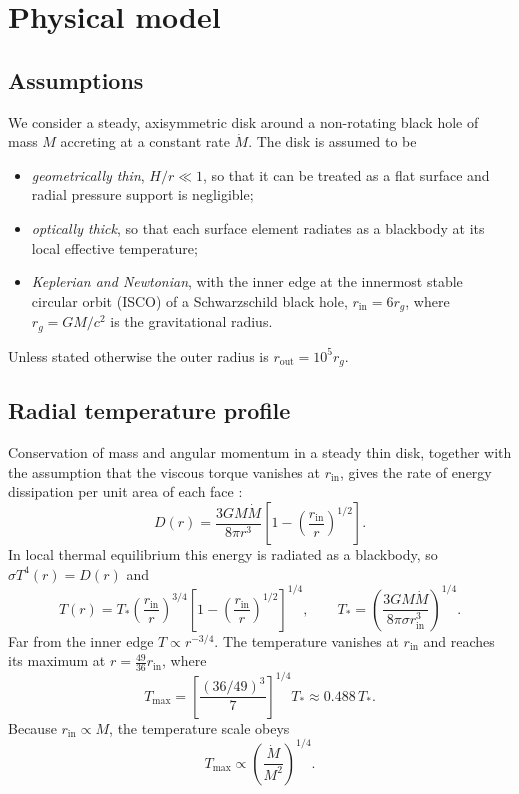 \documentclass[11pt,a4paper]{article}
\newcommand{\Mdot}{\dot M}
\newcommand{\rin}{r_{\mathrm{in}}}
\newcommand{\rout}{r_{\mathrm{out}}}
\newcommand{\Tmax}{T_{\max}}
\newcommand{\rg}{r_{g}}
\begin{document}
\section{Physical model}\label{sec:theory}

\subsection{Assumptions}
We consider a steady, axisymmetric disk around a non-rotating black hole of
mass $M$ accreting at a constant rate $\Mdot$. The disk is assumed to be
\begin{itemize}
  \item \emph{geometrically thin}, $H/r\ll1$, so that it can be treated as a
        flat surface and radial pressure support is negligible;
  \item \emph{optically thick}, so that each surface element radiates as a
        blackbody at its local effective temperature;
  \item \emph{Keplerian and Newtonian}, with the inner edge at the innermost
        stable circular orbit (ISCO) of a Schwarzschild black hole,
        $\rin=6\rg$, where $\rg=GM/c^2$ is the gravitational radius.
\end{itemize}
Unless stated otherwise the outer radius is $\rout=10^5\rg$.

\subsection{Radial temperature profile}
Conservation of mass and angular momentum in a steady thin disk, together
with the assumption that the viscous torque vanishes at $\rin$, gives the
rate of energy dissipation per unit area of each face
\citep{ShakuraSunyaev1973,FrankKingRaine2002}:
\begin{equation}
  D(r)=\frac{3GM\Mdot}{8\pi r^3}\left[1-\left(\frac{\rin}{r}\right)^{1/2}\right].
\end{equation}
In local thermal equilibrium this energy is radiated as a blackbody, so
$\sigma T^4(r)=D(r)$ and
\begin{equation}
  T(r)=T_*\left(\frac{\rin}{r}\right)^{3/4}\left[1-\left(\frac{\rin}{r}\right)^{1/2}\right]^{1/4},
  \qquad
  T_*=\left(\frac{3GM\Mdot}{8\pi\sigma\rin^3}\right)^{1/4}.
  \label{eq:Tr}
\end{equation}
Far from the inner edge $T\propto r^{-3/4}$. The temperature vanishes at
$\rin$ and reaches its maximum at $r=\tfrac{49}{36}\rin$, where
\begin{equation}
  \Tmax=\left[\frac{(36/49)^3}{7}\right]^{1/4}T_*\approx0.488\,T_*.
\end{equation}
Because $\rin\propto M$, the temperature scale obeys
\begin{equation}
  \Tmax\propto\left(\frac{\Mdot}{M^2}\right)^{1/4}.
  \label{eq:Tscaling}
\end{equation}
\end{document}
